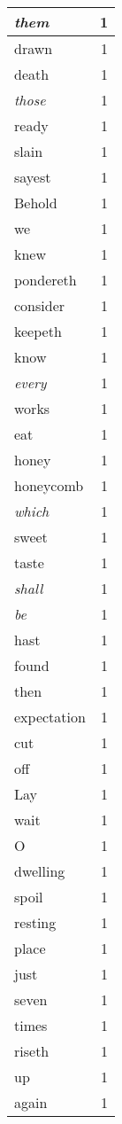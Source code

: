 \begin{center}
\begin{longtable}{l|r}
\emph{them} & 1\\ \hline 
drawn & 1\\ \hline 
death & 1\\ \hline 
\emph{those} & 1\\ \hline 
ready & 1\\ \hline 
slain & 1\\ \hline 
sayest & 1\\ \hline 
Behold & 1\\ \hline 
we & 1\\ \hline 
knew & 1\\ \hline 
pondereth & 1\\ \hline 
consider & 1\\ \hline 
keepeth & 1\\ \hline 
know & 1\\ \hline 
\emph{every} & 1\\ \hline 
works & 1\\ \hline 
eat & 1\\ \hline 
honey & 1\\ \hline 
honeycomb & 1\\ \hline 
\emph{which} & 1\\ \hline 
sweet & 1\\ \hline 
taste & 1\\ \hline 
\emph{shall} & 1\\ \hline 
\emph{be} & 1\\ \hline 
hast & 1\\ \hline 
found & 1\\ \hline 
then & 1\\ \hline 
expectation & 1\\ \hline 
cut & 1\\ \hline 
off & 1\\ \hline 
Lay & 1\\ \hline 
wait & 1\\ \hline 
O & 1\\ \hline 
dwelling & 1\\ \hline 
spoil & 1\\ \hline 
resting & 1\\ \hline 
place & 1\\ \hline 
just & 1\\ \hline 
seven & 1\\ \hline 
times & 1\\ \hline 
riseth & 1\\ \hline 
up & 1\\ \hline 
again & 1\\ \hline 

\end{longtable}
\end{center}
